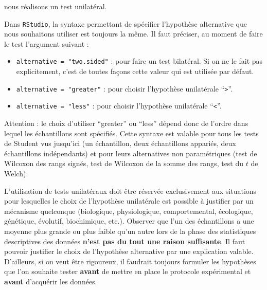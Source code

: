 \documentclass[
  french,
  a4paper,
  DIV=11,
  numbers=noendperiod,
  oneside]{scrreprt}
\providecommand{\tightlist}{%
  \setlength{\itemsep}{0pt}\setlength{\parskip}{0pt}}
\begin{document}
nous réalisons un test unilatéral.

Dans \texttt{RStudio}, la syntaxe permettant de spécifier l'hypothèse
alternative que nous souhaitons utiliser est toujours la même. Il faut
préciser, au moment de faire le test l'argument suivant :

\begin{itemize}
\tightlist
\item
  \texttt{alternative\ =\ "two.sided"} : pour faire un test bilatéral.
  Si on ne le fait pas explicitement, c'est de toutes façons cette
  valeur qui est utilisée par défaut.
\item
  \texttt{alternative\ =\ "greater"} : pour choisir l'hypothèse
  unilatérale ``\texttt{\textgreater{}}''.
\item
  \texttt{alternative\ =\ "less"} : pour choisir l'hypothèse unilatérale
  ``\texttt{\textless{}}''.
\end{itemize}

Attention : le choix d'utiliser ``greater'' ou ``less'' dépend donc de
l'ordre dans lequel les échantillons sont spécifiés. Cette syntaxe est
valable pour tous les tests de Student vus jusqu'ici (un échantillon,
deux échantillons appariés, deux échantillons indépendants) et pour
leurs alternatives non paramétriques (test de Wilcoxon des rangs signés,
test de Wilcoxon de la somme des rangs, test du \(t\) de Welch).

\begin{tcolorbox}[enhanced jigsaw, arc=.35mm, bottomrule=.15mm, bottomtitle=1mm, breakable, colback=white, colbacktitle=quarto-callout-important-color!10!white, colframe=quarto-callout-important-color-frame, coltitle=black, left=2mm, leftrule=.75mm, opacityback=0, opacitybacktitle=0.6, rightrule=.15mm, title=\textcolor{quarto-callout-important-color}{\faExclamation}\hspace{0.5em}{Attention}, titlerule=0mm, toprule=.15mm, toptitle=1mm]

L'utilisation de tests unilatéraux doit être réservée exclusivement aux
situations pour lesquelles le choix de l'hypothèse unilatérale est
possible à justifier par un mécanisme quelconque (biologique,
physiologique, comportemental, écologique, génétique, évolutif,
biochimique, etc.). Observer que l'un des échantillons a une moyenne
plus grande ou plus faible qu'un autre lors de la phase des statistiques
descriptives des données \textbf{n'est pas du tout une raison
suffisante}. Il faut pouvoir justifier le choix de l'hypothèse
alternative par une explication valable. D'ailleurs, si on veut être
rigoureux, il faudrait toujours formuler les hypothèses que l'on
souhaite tester \textbf{avant} de mettre en place le protocole
expérimental et \textbf{avant} d'acquérir les données.

\end{tcolorbox}
\end{document}
